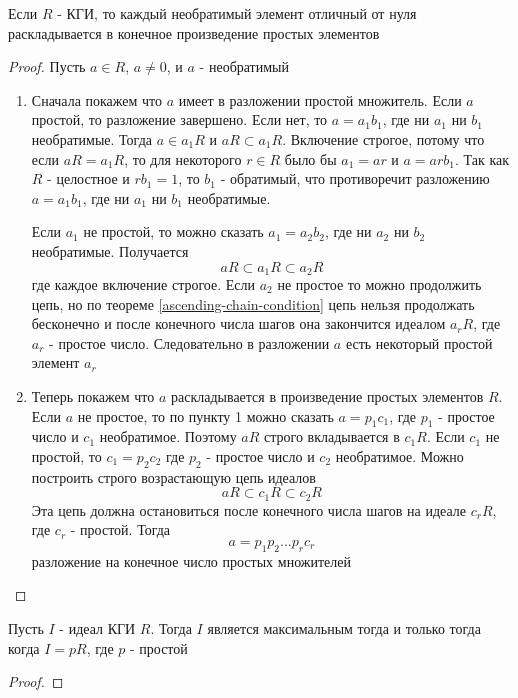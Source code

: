\documentclass[../main/document.tex]{subfiles}
\begin{document}
\begin{thm}\label{proper-factorization}
Если $R$ - КГИ, то каждый необратимый элемент отличный от нуля раскладывается в конечное произведение простых элементов
\begin{proof}
Пусть $a\in R$, $a\neq 0$, и $a$ - необратимый
\begin{enumerate}
\item Сначала покажем что $a$ имеет в разложении простой множитель. Если $a$ простой, то разложение завершено. Если нет, то $a=a_1b_1$, где ни $a_1$ ни $b_1$ необратимые. Тогда $a\in a_1R$ и $aR \subset a_1R$. Включение строгое, потому что если $aR=a_1R$, то для некоторого $r\in R$ было бы $a_1=ar$ и $a=arb_1$. Так как $R$ - целостное и $rb_1=1$, то $b_1$ - обратимый, что противоречит разложению $a=a_1b_1$, где ни $a_1$ ни $b_1$ необратимые.

Если $a_1$ не простой, то можно сказать $a_1=a_2b_2$, где ни $a_2$ ни $b_2$ необратимые. Получается
$$aR \subset a_1R \subset a_2R$$
где каждое включение строгое. Если $a_2$ не простое то можно продолжить цепь, но по теореме \ref{ascending-chain-condition} цепь нельзя продолжать бесконечно  и после конечного числа шагов она закончится идеалом $a_rR$, где $a_r$ - простое число. Следовательно в разложении $a$ есть некоторый простой элемент $a_r$
\item Теперь покажем что $a$ раскладывается в произведение простых элементов $R$. Если $a$ не простое, то по пункту 1 можно сказать $a=p_1c_1$, где $p_1$ - простое число и $c_1$ необратимое. Поэтому $aR$ строго вкладывается в $c_1R$. Если $c_1$ не простой, то $c_1=p_2c_2$ где $p_2$ - простое число и $c_2$ необратимое. Можно построить строго возрастающую цепь идеалов
$$aR \subset c_1R \subset c_2R$$
Эта цепь должна остановиться после конечного числа шагов на идеале $c_rR$, где $c_r$ - простой. Тогда
$$a=p_1p_2...p_rc_r$$
разложение на конечное число простых множителей
\end{enumerate}
\end{proof}
\end{thm}
\begin{lemma}
Пусть $I$ - идеал КГИ $R$. Тогда $I$ является максимальным тогда и только тогда когда $I=pR$, где $p$ - простой
\begin{proof}

\end{proof}
\end{lemma}
\end{document}
